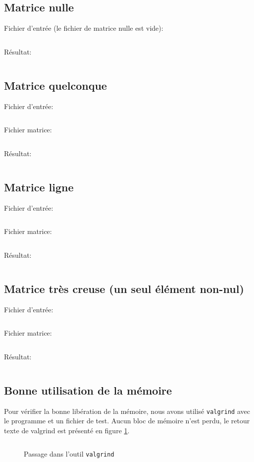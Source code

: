 \subsection{Matrice nulle}
	Fichier d'entrée (le fichier de matrice nulle est vide):
	\inputminted[frame=single,label=test\_nulle]{text}{../tests/test_nulle}
	Résultat:
	\inputminted[frame=single,label=Résultat matrice nulle]{text}{../tests/resultat_test_nulle}
\subsection{Matrice quelconque}
	Fichier d'entrée:
	\inputminted[frame=single,label=test\_1]{text}{../tests/test_1}
	Fichier matrice:
	\inputminted[frame=single,label=matrice\_1]{text}{../tests/matrice_1}
	Résultat:
	\inputminted[frame=single,label=Résultat matrice quelconque,tabsize=4]{text}{../tests/resultat_test_1}
\subsection{Matrice ligne}
	Fichier d'entrée:
	\inputminted[frame=single,label=test\_2]{text}{../tests/test_2}
	Fichier matrice:
	\inputminted[frame=single,label=matrice\_2]{text}{../tests/matrice_2}
	Résultat:
	\inputminted[frame=single,label=Résultat matrice ligne,tabsize=2,breaklines=true]{text}{../tests/resultat_test_2}
\newpage
\subsection{Matrice très creuse (un seul élément non-nul)}
	\label{subs:mat_creuse}
	Fichier d'entrée:
	\inputminted[frame=single,label=test\_3]{text}{../tests/test_3}
	Fichier matrice:
	\inputminted[frame=single,label=matrice\_3]{text}{../tests/matrice_3}
	Résultat:
	\inputminted[frame=single,label=Résultat matrice très creuse,tabsize=2,breaklines=true]{text}{../tests/resultat_test_3}
\newpage
\subsection{Bonne utilisation de la mémoire}
	Pour vérifier la bonne libération de la mémoire, nous avons utilisé \texttt{valgrind} avec le programme et un fichier de test. Aucun bloc de mémoire n'est perdu, le retour texte de valgrind est présenté en figure \ref{fig:valgrind}.
	\begin{figure}[H]
	  \inputminted[frame=single,label=Resultat Valgrind]{text}{../tests/valgrind_test_1}
	  \caption{Passage dans l'outil \texttt{valgrind}}
	  \label{fig:valgrind}
	\end{figure}

